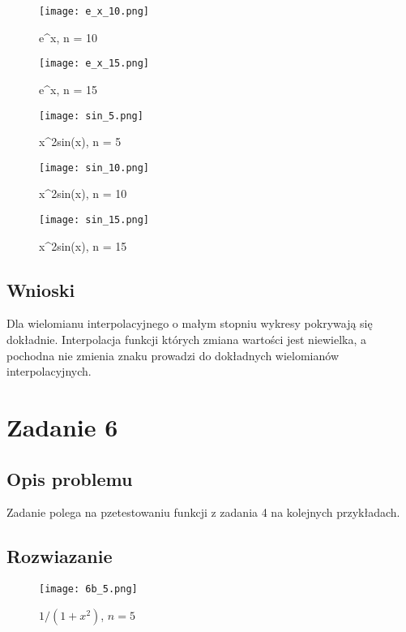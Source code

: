 \documentclass{article}
\begin{document}
\begin{figure}[H] 
\centering
\texttt{[image: e\_x\_10.png]}
\caption{e^x, n = 10}
\label{e_x_10}
\end{figure}

\begin{figure}[H] 
\centering
\texttt{[image: e\_x\_15.png]}
\caption{e^x, n = 15}
\label{e_x_15}
\end{figure}

\begin{figure}[H] 
\centering
\texttt{[image: sin\_5.png]}
\caption{x^2sin(x), n = 5}
\label{x^2sin(x)_5}
\end{figure}

\begin{figure}[H] 
\centering
\texttt{[image: sin\_10.png]}
\caption{x^2sin(x), n = 10}
\label{x^2sin(x)_10}
\end{figure}

\begin{figure}[H] 
\centering
\texttt{[image: sin\_15.png]}
\caption{x^2sin(x), n = 15}
\label{x^2sin(x)_15}
\end{figure}

\subsection{Wnioski}
Dla wielomianu interpolacyjnego o małym stopniu wykresy pokrywają się dokładnie. Interpolacja funkcji których zmiana wartości jest niewielka, a pochodna nie zmienia znaku prowadzi do dokładnych wielomianów interpolacyjnych.

\section{Zadanie 6}
\subsection{Opis problemu}
Zadanie polega na pzetestowaniu funkcji z zadania 4 na kolejnych przykładach.
\subsection{Rozwiazanie}

\begin{figure}[H] 
\centering
\texttt{[image: 6b\_5.png]}
\caption{$1 / (1+x^2)$, $n = 5$}
\label{1_(1+x^2)_5}
\end{figure}
\end{document}
